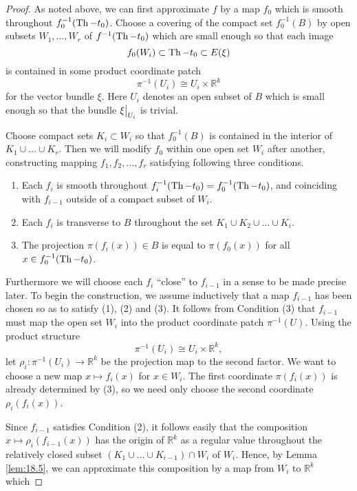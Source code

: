 \documentclass[../main]{subfiles}
\begin{document}
\begin{proof}
As noted above, we can first approximate $f$ by a map $f_0$ which is smooth throughout $f_0^{-1}(\operatorname{Th} - t_0)$. Choose a covering of the compact set $f_0^{-1}(B)$ by open subsets $W_1, \ldots, W_r$ of $f^{-1}(\operatorname{Th} - t_0)$ which are small enough so that each image \[f_0(W_i) \subset \operatorname{Th} - t_0 \subset E(\xi)\] is contained in some product coordinate patch \[\pi^{-1}(U_i) \cong U_i \times {\mathbb R}^k\] for the vector bundle $\xi$. Here $U_i$ denotes an open subset of $B$ which is small enough so that the bundle $\xi \big{|}_{U_i}$ is trivial. 

Choose compact sets $K_i \subset W_i$ so that $f_0^{-1}(B)$ is contained in the interior of $K_1 \cup \ldots \cup K_r$. Then we will modify $f_0$ within one open set $W_i$ after another, constructing mapping $f_1, f_2, \ldots, f_r$ satisfying following three conditions. 

\begin{enumerate}[label=(\arabic*)]
    \item Each $f_i$ is smooth throughout $f_i^{-1}(\operatorname{Th} - t_0) = f_0^{-1}(\operatorname{Th} - t_0)$, and coinciding with $f_{i - 1}$ outside of a compact subset of $W_i$.
    \item Each $f_i$ is transverse to $B$ throughout the set $K_1 \cup K_2 \cup \ldots \cup K_i$.
    \item The projection $\pi(f_i(x)) \in B$ is equal to $\pi(f_0(x))$ for all $x \in f_0^{-1}(\operatorname{Th} - t_0)$.
\end{enumerate}

Furthermore we will choose each $f_i$ ``close'' to $f_{i - 1}$ in a sense to be made precise later. To begin the construction, we assume inductively that a map $f_{i - 1}$ has been chosen so as to satisfy (1), (2) and (3). It follows from Condition (3) that $f_{i - 1}$ must map the open set $W_i$ into the product coordinate patch $\pi^{-1}(U)$. Using the product structure \[\pi^{-1}(U_i) \cong U_i \times {\mathbb R}^k,\] let $\rho_i : \pi^{-1}(U_i) \longrightarrow {\mathbb R}^k$ be the projection map to the second factor. We want to choose a new map $x \mapsto f_i(x)$ for $x \in W_i$. The first coordinate $\pi(f_i(x))$ is already determined by (3), so we need only choose the second coordinate $\rho_i(f_i(x))$. 

Since $f_{i - 1}$ satisfies Condition (2), it follows easily that the composition \newline $x \mapsto \rho_i(f_{i - 1}(x))$ has the origin of ${\mathbb R}^k$ as a regular value throughout the relatively closed subset $(K_1 \cup \ldots \cup K_{i - 1}) \cap W_i$ of $W_i$. Hence, by Lemma \ref{lem:18.5}, we can approximate this composition by a map from $W_i$ to ${\mathbb R}^k$ which


\end{proof}
\end{document}
